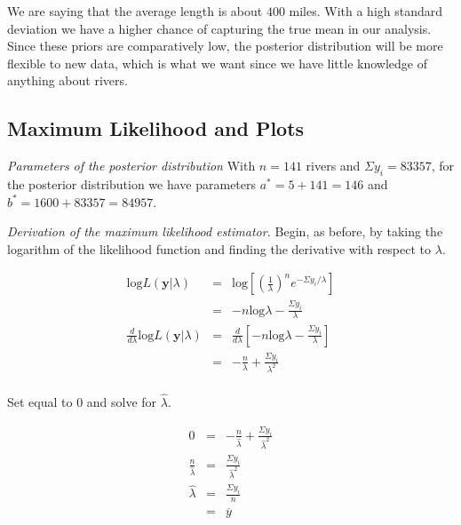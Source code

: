 \documentclass[12pt]{article}
\newcommand{\ybar}{\overline{y}}
\begin{document}
\noindent We are saying that the average length is about $400$ miles.  With a high standard deviation we have a higher chance of capturing the true mean in our analysis.  Since these priors are comparatively low, the posterior distribution will be more flexible to new data, which is what we want since we have little knowledge of anything about rivers.

\subsection{Maximum Likelihood and Plots}

%

\noindent \emph{Parameters of the posterior distribution} With $n=141$ rivers and $\Sigma y_i=83357$, for the posterior distribution we have parameters $a^*=5+141=146$ and $b^*=1600+83357=84957$.
\bigskip

\noindent \textit{Derivation of the maximum likelihood estimator.} Begin, as before, by taking the logarithm of the likelihood function and finding the derivative with respect to $\lambda$.

\begin{eqnarray*}
\mathrm{log}L(\mathbf{y}|\lambda) &=& \mathrm{log}\left[\left(\frac{1}{\lambda}\right)^ne^{-\Sigma y_i/\lambda}\right] \\
&=& -n\mathrm{log}\lambda-\frac{\Sigma y_i}{\lambda} \\
\frac{d}{d\lambda}\mathrm{log}L(\mathbf{y}|\lambda) &=& \frac{d}{d\lambda}\left[-n\mathrm{log}\lambda-\frac{\Sigma y_i}{\lambda}\right] \\
&=& -\frac{n}{\lambda}+\frac{\Sigma y_i}{\lambda^2} \\
\end{eqnarray*}

\noindent Set equal to 0 and solve for $\hat{\lambda}$.

\begin{eqnarray*}
0 &=& -\frac{n}{\hat{\lambda}}+\frac{\Sigma y_i}{\hat{\lambda}^2} \\
\frac{n}{\hat{\lambda}} &=& \frac{\Sigma y_i}{\hat{\lambda}^2} \\
\hat{\lambda} &=& \frac{\Sigma y_i}{n} \\
&=& \ybar \\
\end{eqnarray*}
\end{document}
